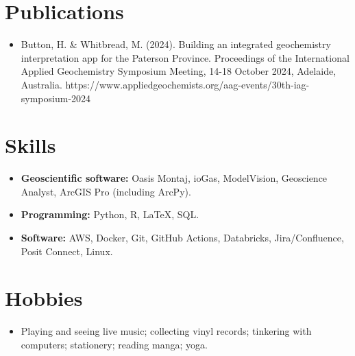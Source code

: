 \documentclass[letterpaper,10.5pt]{article}
\newcommand{\resumeItem}[2]{
  \item\small{
    \textbf{#1}{#2 \vspace{-2pt}}
  }
}
\newcommand{\resumeSubItem}[2]{\resumeItem{#1}{#2}\vspace{-4pt}}
\newcommand{\resumeSubHeadingListStart}{\begin{itemize}[leftmargin=*]}
\newcommand{\resumeSubHeadingListEnd}{\end{itemize}}
\begin{document}
\section{Publications}
  \resumeSubHeadingListStart
    \resumeSubItem{}
      {Button, H. \& Whitbread, M. (2024). Building an integrated geochemistry interpretation app for the Paterson Province. Proceedings of the International Applied Geochemistry Symposium Meeting, 14-18 October 2024, Adelaide, Australia. https://www.appliedgeochemists.org/aag-events/30th-iag-symposium-2024
    }
  \resumeSubHeadingListEnd


\section{Skills}
  \resumeSubHeadingListStart
  \resumeSubItem{Geoscientific software: }{
    Oasis Montaj, ioGas, ModelVision, Geoscience Analyst, ArcGIS Pro (including ArcPy).
  }
  \resumeSubItem{Programming: }{
    Python, R, \LaTeX, SQL.
  }
  \resumeSubItem{Software: }{
    AWS, Docker, Git, GitHub Actions, Databricks, Jira/Confluence, Posit Connect, Linux.
  }
  \resumeSubHeadingListEnd


\section{Hobbies}
\resumeSubHeadingListStart
  \resumeSubItem{}
    {Playing and seeing live music; collecting vinyl records; tinkering with computers; stationery; reading manga; yoga.}
\resumeSubHeadingListEnd
  
\end{document}
